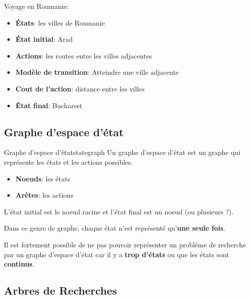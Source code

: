 \documentclass[a4paper, 12pt]{extarticle}
\begin{document}
\begin{example}\leavevmode
    Voyage en Roumanie:
    \begin{itemize}
        \item \textbf{États}: les villes de Roumanie
        \item \textbf{État initial}: Arad
        \item \textbf{Actions}: les routes entre les villes adjacentes
        \item \textbf{Modèle de transition}: Atteindre une ville adjacente
        \item \textbf{Cout de l'action}: distance entre les villes
        \item \textbf{État final}: Bucharest 
    \end{itemize}
\end{example}


\subsection{Graphe d'espace d'état} %
\label{sub:graphe_d_espace_d_etat}

\begin{definition}{Graphe d'espace d'état}{stategraph}
    Un graphe d'espace d'état est un graphe qui représente les états et les actions possibles.
    \begin{itemize}
        \item \textbf{Noeuds}: les états
        \item \textbf{Arêtes}: les actions
    \end{itemize} 
    L'état initial est le noeud racine et l'état final est un noeud (ou plusieurs ?).
\end{definition}

\begin{warning}
    Dans ce genre de graphe, chaque état n'est représenté qu'\textbf{une seule fois}.
\end{warning}

\begin{remark}\leavevmode
    Il est fortement possible de ne pas pouvoir représenter un problème de recherche par un graphe d'espace d'état car 
    il y a \textbf{trop d'états} ou que les états sont \textbf{continus}.
\end{remark}


\subsection{Arbres de Recherches} %
\label{sub:arbres_de_recherches}
\end{document}
